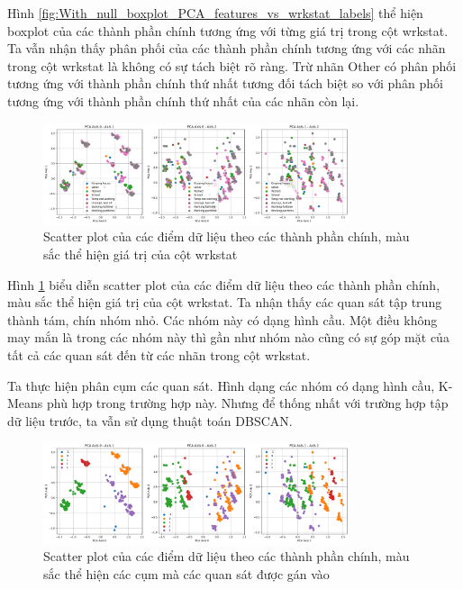 Hình \ref{fig:With_null_boxplot_PCA_features_vs_wrkstat_labels} thể hiện boxplot của các thành phần chính tương ứng với từng giá trị trong cột wrkstat.
Ta vẫn nhận thấy phân phối của các thành phần chính tương ứng với các nhãn trong cột wrkstat là không có sự tách biệt rõ ràng.
Trừ nhãn Other có phân phối tương ứng với thành phần chính thứ nhất tương đối tách biệt so với phân phối tương ứng với thành phần chính thứ nhất của các nhãn còn lại.

\begin{figure}[H]
    \centering
    \includegraphics[width=0.8\textwidth]{figures/Thanh/Data_Analysis/With_null_scatterplot_couples_of_PCA_features_vs_wrkstat_labels.png}
    \caption{Scatter plot của các điểm dữ liệu theo các thành phần chính, màu sắc thể hiện giá trị của cột wrkstat}
    \label{fig:With_null_scatterplot_couples_of_PCA_features_vs_wrkstat_labels}
\end{figure}

Hình \ref{fig:With_null_scatterplot_couples_of_PCA_features_vs_wrkstat_labels} biểu diễn scatter plot của các điểm dữ liệu theo các thành phần chính, màu sắc thể hiện giá trị của cột wrkstat.
Ta nhận thấy các quan sát tập trung thành tám, chín nhóm nhỏ.
Các nhóm này có dạng hình cầu.
Một điều không may mắn là trong các nhóm này thì gần như nhóm nào cũng có sự góp mặt của tất cả các quan sát đến từ các nhãn trong cột wrkstat.

Ta thực hiện phân cụm các quan sát.
Hình dạng các nhóm có dạng hình cầu, K-Means phù hợp trong trường hợp này.
Nhưng để thống nhất với trường hợp tập dữ liệu trước, ta vẫn sử dụng thuật toán DBSCAN.

\begin{figure}[H]
    \centering
    \includegraphics[width=0.8\textwidth]{figures/Thanh/Data_Analysis/With_null_scatterplot_couples_of_PCA_features_vs_pseudo_clustering_labels.png}
    \caption{Scatter plot của các điểm dữ liệu theo các thành phần chính, màu sắc thể hiện các cụm mà các quan sát được gán vào}
    \label{fig:With_null_scatterplot_couples_of_PCA_features_vs_pseudo_clustering_labels}
\end{figure}

